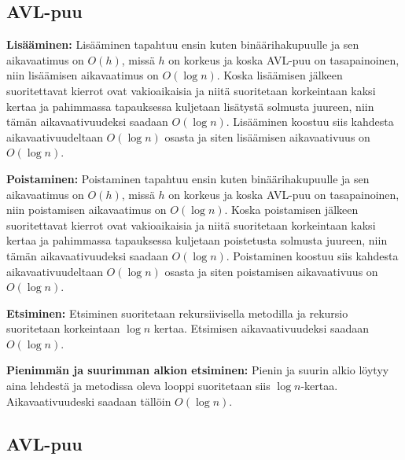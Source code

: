 \documentclass[12pt,a4paper,leqno,titlepage,twoside]{article}
\begin{document}
\subsection*{AVL-puu}

\begin{description}
\item{\textbf{Lisääminen:}} Lisääminen tapahtuu ensin kuten binäärihakupuulle
ja sen aikavaatimus on $O(h)$, missä $h$ on korkeus ja koska AVL-puu on tasapainoinen,
niin lisäämisen aikavaatimus on $O(\log n)$. Koska lisäämisen jälkeen suoritettavat 
kierrot ovat vakioaikaisia ja niitä suoritetaan korkeintaan kaksi kertaa ja pahimmassa 
tapauksessa kuljetaan lisätystä solmusta juureen, niin tämän aikavaativuudeksi 
saadaan $O(\log n)$. Lisääminen koostuu siis kahdesta aikavaativuudeltaan $O(\log n)$
osasta ja siten lisäämisen aikavaativuus on $O(\log n)$.

\item{\textbf{Poistaminen:}} Poistaminen tapahtuu ensin kuten binäärihakupuulle
ja sen aikavaatimus on $O(h)$, missä $h$ on korkeus ja koska AVL-puu on tasapainoinen,
niin poistamisen aikavaatimus on $O(\log n)$. Koska poistamisen jälkeen suoritettavat
kierrot ovat vakioaikaisia ja niitä suoritetaan korkeintaan kaksi kertaa ja pahimmassa
tapauksessa kuljetaan poistetusta solmusta juureen, niin tämän aikavaativuudeksi
saadaan $O(\log n)$. Poistaminen koostuu siis kahdesta aikavaativuudeltaan $O(\log n)$
osasta ja siten poistamisen aikavaativuus on $O(\log n)$.

\item{\textbf{Etsiminen:}} Etsiminen suoritetaan rekursiivisella metodilla ja
rekursio suoritetaan korkeintaan $\log n$ kertaa. Etsimisen aikavaativuudeksi
saadaan $O(\log n)$.

\item{\textbf{Pienimmän ja suurimman alkion etsiminen:}} Pienin ja suurin alkio
löytyy aina lehdestä ja metodissa oleva looppi suoritetaan siis $\log n$-kertaa.
Aikavaativuudeski saadaan tällöin $O(\log n)$.
\end{description}

\subsection*{AVL-puu}
\end{document}
